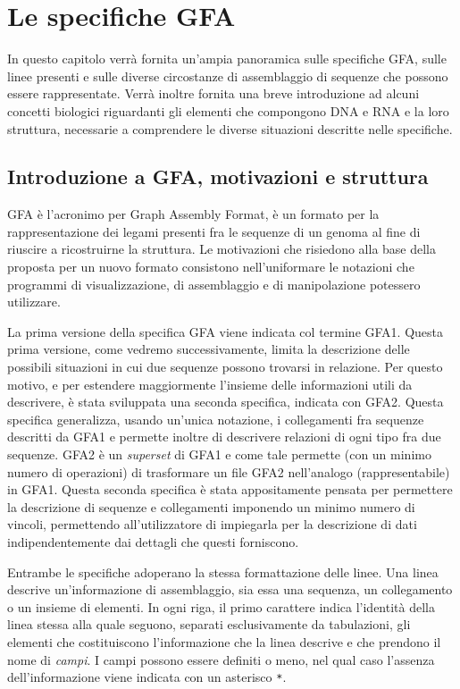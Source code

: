 \chapter{Le specifiche GFA}

In questo capitolo verrà fornita un'ampia panoramica sulle specifiche
GFA, sulle linee presenti e sulle diverse circostanze di assemblaggio
di sequenze che possono essere rappresentate.
Verrà inoltre fornita una breve introduzione ad alcuni concetti
biologici riguardanti gli elementi che compongono DNA e RNA e
la loro struttura, necessarie a comprendere le diverse situazioni
descritte nelle specifiche.

\section{Introduzione a GFA, motivazioni e struttura}
GFA è l'acronimo per Graph Assembly Format, è un
formato per la rappresentazione dei legami presenti fra le sequenze di
un genoma al fine di riuscire a ricostruirne la struttura.
Le motivazioni che risiedono alla base della proposta per un nuovo
formato consistono nell'uniformare le notazioni che programmi
di visualizzazione, di assemblaggio e di manipolazione potessero
utilizzare.

La prima versione della specifica GFA viene indicata col termine
GFA1. Questa prima versione, come vedremo successivamente,
limita la descrizione delle possibili situazioni in cui due sequenze
possono trovarsi in relazione. Per questo motivo, e per estendere
maggiormente l'insieme delle informazioni utili da descrivere,
è stata sviluppata una seconda specifica, indicata con GFA2.
Questa specifica generalizza, usando un'unica notazione,
i collegamenti fra sequenze descritti da GFA1 e permette inoltre
di descrivere relazioni di ogni tipo fra due sequenze.
GFA2 è un \emph{superset} di GFA1 e come tale permette
(con un minimo numero di operazioni) di trasformare un file GFA2
nell'analogo (rappresentabile) in GFA1. Questa seconda specifica
è stata appositamente pensata per permettere la descrizione di
sequenze e collegamenti imponendo un minimo numero di vincoli,
permettendo all'utilizzatore di impiegarla per la descrizione di dati
indipendentemente dai dettagli che questi forniscono.

Entrambe le specifiche adoperano la stessa formattazione delle linee.
Una linea descrive un'informazione di assemblaggio, sia
essa una sequenza, un collegamento o un insieme di elementi.
In ogni riga, il primo carattere indica
l'identità della linea stessa alla quale seguono, separati esclusivamente
da tabulazioni, gli elementi che costituiscono l'informazione
che la linea descrive e che prendono il nome di \emph{campi}.
I campi possono essere definiti o meno, nel qual caso l'assenza
dell'informazione viene indicata con un asterisco \texttt{*}.

